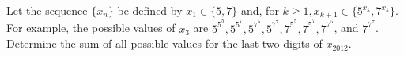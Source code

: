 \begin{problem}
    Let the sequence $\{x_n\}$ be defined by $x_1 \in \{5, 7\}$ and, for $k \ge 1, x_{k+1} \in \{5^{x_k} , 7^{x_k} \}$. For example, the possible values of $x_3$ are $5^{5^5}, 5^{5^7}, 5^{7^5}, 5^{7^7}, 7^{5^5}, 7^{5^7}, 7^{7^5}$, and $7^{7^7}$. Determine the sum of all possible values for the last two digits of $x_{2012}$.

    \label{12PUMACNA3}
\end{problem}